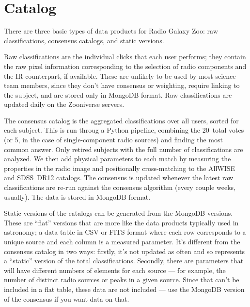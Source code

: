 \documentclass[a4,useAMS,usenatbib]{mn2e}
\begin{document}
\section{Catalog}\label{sec:catalog}

There are three basic types of data products for Radio Galaxy Zoo: raw classifications, consensus catalogs, and static versions. 
 
Raw classifications are the individual clicks that each user performs; they contain the raw pixel information corresponding to the selection of radio components and the IR counterpart, if available. These are unlikely to be used by most science team members, since they don't have consensus or weighting, require linking to the subject, and are stored only in MongoDB format. Raw classifications are updated daily on the Zooniverse servers. 
 
The consensus catalog is the aggregated classifications over all users, sorted for each subject. This is run throug a Python pipeline, combining the 20~total votes (or 5, in the case of single-component radio sources) and finding the most common answer. Only retired subjects with the full number of classifications are analyzed. We then add physical parameters to each match by measuring the properties in the radio image and positionally cross-matching to the AllWISE \citep{cut13} and SDSS~DR12 \citep{ala15} catalogs. The consensus is updated whenever the latest raw classifications are re-run against the consensus algorithm (every couple weeks, usually). The data is stored in MongoDB format. 
 
Static versions of the catalogs can be generated from the MongoDB versions. These are ``flat'' versions that are more like the data products typically used in astronomy; a data table in CSV or FITS format where each row corresponds to a unique source and each column is a measured parameter. It's different from the consensus catalog in two ways: firstly, it's not updated as often and so represents a ``static'' version of the total classifications. Secondly, there are parameters that will have different numbers of elements for each source --- for example, the number of distinct radio sources or peaks in a given source. Since that can't be included in a flat table, these data are not included --- use the MongoDB version of the consensus if you want data on that. 
 
\end{document}
